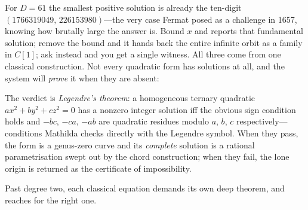 
For $D=61$ the smallest positive solution is already the ten-digit
$(1766319049,\,226153980)$---the very case Fermat posed as a challenge in 1657, knowing
how brutally large the answer is. Bound $x$ and  reports that fundamental
solution; remove the bound and it hands back the entire infinite orbit as a
 family in $C[1]$; ask  instead and you get
a single witness. All three come from one classical construction. Not every
quadratic form has solutions at all, and the system will \emph{prove} it when they are
absent:

\begin{codepairs}
\end{codepairs}

\noindent The verdict is \emph{Legendre's theorem}: a
homogeneous ternary quadratic $ax^2+by^2+cz^2=0$ has a nonzero integer solution iff the
obvious sign condition holds and $-bc$, $-ca$, $-ab$ are quadratic residues modulo $a$,
$b$, $c$ respectively---conditions Mathilda checks directly with the Legendre symbol.
When they pass, the form is a genus-zero curve and its \emph{complete} solution is a
rational parametrisation swept out by the chord construction; when they fail, the lone
origin is returned as the certificate of impossibility.

Past degree two, each classical equation demands its own deep theorem, and 
reaches for the right one.

